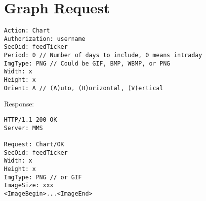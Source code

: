 \documentclass[12pt,twoside,letterpaper]{report}
\begin{document}
\section*{Graph Request}
\begin{verbatim}
Action: Chart
Authorization: username
SecOid: feedTicker
Period: 0 // Number of days to include, 0 means intraday
ImgType: PNG // Could be GIF, BMP, WBMP, or PNG
Width: x
Height: x
Orient: A // (A)uto, (H)orizontal, (V)ertical
\end{verbatim}

Response:
\begin{verbatim}
HTTP/1.1 200 OK
Server: MMS

Request: Chart/OK
SecOid: feedTicker
Width: x
Height: x
ImgType: PNG // or GIF
ImageSize: xxx
<ImageBegin>...<ImageEnd>
\end{verbatim}
\end{document}
